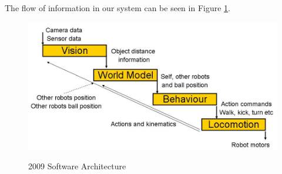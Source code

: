 The flow of information in our system can be seen in Figure
\ref{fig:software}. 

\begin{figure}[!ht]
\begin{center}
    \scalebox{0.5} {\includegraphics{figs/software.jpg} }
    \caption{2009 Software Architecture}
    \label{fig:software}
\end{center}
\end{figure}

